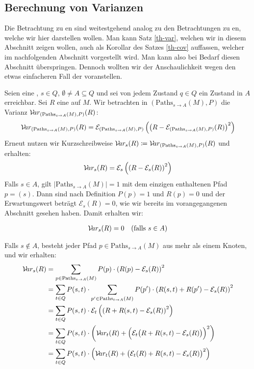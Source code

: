 \documentclass[a4paper]{article}
\theoremstyle{nonumberplain}
\begin{document}
\subsection{Berechnung von Varianzen}

Die Betrachtung zu \cov{}en sind weitestgehend analog zu den Betrachtungen zu \var{}en, welche wir hier darstellen wollen. Man kann Satz \ref{th-var}, welchen wir in diesem Abschnitt zeigen wollen, auch als Korollar des Satzes \ref{th-cov} auffassen, welcher im nachfolgenden Abschnitt vorgestellt wird. Man kann also bei Bedarf diesen Abschnitt überspringen. Dennoch wollten wir der Anschaulichkeit wegen den etwas einfacheren Fall der \var{} voranstellen.

Seien \mcex{} eine \mc{}, $s \in Q$, $\emptyset \neq A \subseteq Q$ und  sei von jedem Zustand $q\in Q$ ein Zustand in $A$ erreichbar. Sei $R$ eine  \reward{} auf $M$. Wir betrachten in $(\mathrm{Paths}_{s \rightarrow A}(M), P)$ die Varianz $\mathcal{V}\!ar_{(\mathrm{Paths}_{s \rightarrow A}(M), P)}(R)$:
\begin{equation}
	\mathcal{V}\!ar_{(\mathrm{Paths}_{s \rightarrow A}(M), P)}(R) = \mathcal{E}_{(\mathrm{Paths}_{s \rightarrow A}(M), P)}\left(\left(R - \mathcal{E}_{(\mathrm{Paths}_{s \rightarrow A}(M), P)} (R)\right)^{2}\right) 
\end{equation}
Erneut nutzen wir Kurzschreibweise $\mathcal{V}\!ar_{s}(R) \coloneqq \mathcal{V}\!ar_{(\mathrm{Paths}_{s \rightarrow A}(M), P)}(R)$ und erhalten:
\begin{equation}
\mathcal{V}\!ar_{s}(R) = \mathcal{E}_{s}\left(\left(R - \mathcal{E}_{s} (R)\right)^{2}\right)
\end{equation}
Falls $s \in A$, gilt $|\mathrm{Paths}_{s \rightarrow A}(M)| = 1$ mit dem einzigen enthaltenen Pfad $p = (s)$. Dann sind nach Definition $P(p) = 1$ und $R(p) = 0$ und der Erwartungswert beträgt $\mathcal{E}_{s}(R) = 0$, wie wir bereits im vorangegangenen Abschnitt gesehen haben. Damit erhalten wir:

\begin{align}
\mathcal{V}\!ar_{s}(R) = 0 && \text{(falls $s \in A$)}\label{var_trivial}
\end{align}

Falls $s \notin A$, besteht jeder Pfad $p \in \mathrm{Paths}_{s \rightarrow A}(M)$ aus mehr als einem Knoten, und wir erhalten:
\begin{align}
\mathcal{V}\!ar_{s}(R) & = \sum_{p \in \mathrm{Paths}_{s \rightarrow A}(M)}{P(p) \cdot \left(R(p) - \mathcal{E}_{s}(R)\right)^2} \\
& = \sum_{t \in Q}{ P(s,t) \cdot \sum_{p' \in \mathrm{Paths}_{t \rightarrow A}(M)}{ P(p') \cdot \left(R(s,t) + R(p') - \mathcal{E}_{s}(R)\right)^2 } } \\
& = \sum_{t \in Q}{ P(s,t) \cdot \mathcal{E}_{t}\left(\left(R + R(s,t) - \mathcal{E}_{s}(R)\right)^2\right) } \\
& = \sum_{t \in Q}{ P(s,t) \cdot \bigg(\mathcal{V}\!ar_{t}(R) + \Big(\mathcal{E}_{t}\big(R + R(s,t) - \mathcal{E}_{s}(R)\big)\Big)^2\bigg) } \label{pre-var_recursive} \\
& = \sum_{t \in Q}{ P(s,t) \cdot \Big(\mathcal{V}\!ar_{t}(R) + \big(\mathcal{E}_{t}(R) + R(s,t) - \mathcal{E}_{s}(R)\big)^2\Big) } \label{var_recursive}
\end{align}
\end{document}
